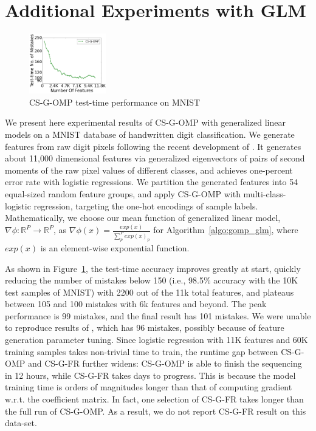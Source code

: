 \section{Additional Experiments with GLM}

\begin{figure}[h]
\includegraphics[width=0.3\textwidth]{img/extra_exp_v2.png}
\caption{CS-G-OMP test-time performance on MNIST} 
\label{fig:mnist}
\end{figure}
We present here experimental results of CS-G-OMP with generalized linear models on a MNIST database of handwritten digit classification\cite{MNIST}.
We generate features from raw digit pixels following the recent development of \cite{gem}. It  generates about 11,000 dimensional features via generalized eigenvectors of pairs of second moments of the raw pixel values of different classes, and achieves one-percent error rate with logistic regressions. We partition the generated features into 54 equal-sized random feature groups, and apply CS-G-OMP with multi-class-logistic regression, targeting the one-hot encodings of sample labels. Mathematically, we choose our mean function of generalized linear model, $\nabla \phi: \mathbb{R}^P \rightarrow \mathbb{R}^P$, as $\nabla \phi(x) = \frac{exp(x)}{\sum _p^P exp(x)_p}$ for Algorithm~\ref{algo:gomp_glm}, where $exp(x)$ is an element-wise exponential function. 

As shown in Figure~\ref{fig:mnist}, the test-time accuracy improves greatly at start, quickly reducing the number of mistakes below 150 (i.e., 98.5\% accuracy with the 10K test samples of MNIST) with 2200 out of the 11k total features, and plateaus between 105 and 100 mistakes with 6k features and beyond. The peak performance is 99 mistakes, and the final result has 101 mistakes. We were unable to reproduce results of \cite{gem}, which has 96 mistakes, possibly because of feature generation parameter tuning. Since logistic regression with 11K features and 60K training samples takes non-trivial time to train, the runtime gap between CS-G-OMP and CS-G-FR further widens: CS-G-OMP is able to finish the sequencing in 12 hours, while CS-G-FR takes days to progress. This is because the model training time is orders of magnitudes longer than that of computing gradient w.r.t. the coefficient matrix. In fact, one selection of CS-G-FR takes longer than the full run of CS-G-OMP. As a result, we do not report CS-G-FR result on this data-set.




